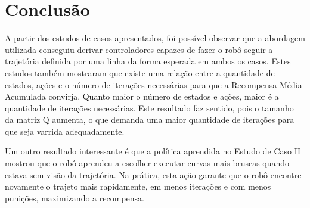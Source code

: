 \documentclass[a4paper]{ifacconf}
\begin{document}
\section{Conclusão}

A partir dos estudos de casos apresentados, foi possível observar que a abordagem utilizada conseguiu derivar controladores capazes de fazer o robô seguir a trajetória definida por uma linha da forma esperada em ambos os casos. Estes estudos também mostraram que existe uma relação entre a quantidade de estados, ações e o número de iterações necessárias para que a Recompensa Média Acumulada convirja. Quanto maior o número de estados e ações, maior é a quantidade de iterações necessárias. Este resultado faz sentido, pois o tamanho da matriz Q aumenta, o que demanda uma maior quantidade de iterações para que seja varrida adequadamente. 

Um outro resultado interessante é que a política aprendida no Estudo de Caso II mostrou que o robô aprendeu a escolher executar curvas mais bruscas quando estava sem visão da trajetória. Na prática, esta ação garante que o robô encontre novamente o trajeto mais rapidamente, em menos iterações e com menos punições, maximizando a recompensa.

                                                   






\end{document}

